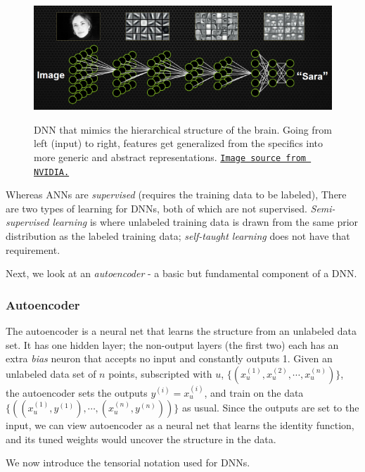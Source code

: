 \documentclass[12pt]{article}  %
\begin{document}
\begin{figure}[h]
\centering
\includegraphics[scale=0.9]{images/DNN.png}\\
\caption{DNN that mimics the hierarchical structure of the brain. Going from left (input) to right, features get generalized from the specifics into more generic and abstract representations. \href{http://devblogs.nvidia.com/parallelforall/accelerate-machine-learning-cudnn-deep-neural-network-library/}{\tt Image source from NVIDIA.}}\label{DNN-fig}
\end{figure}


Whereas ANNs are \emph{supervised} (requires the training data to be labeled), There are two types of learning for DNNs, both of which are not supervised. \emph{Semi-supervised learning} is where unlabeled training data is drawn from the same prior distribution as the labeled training data; \emph{self-taught learning} does not have that requirement.

Next, we look at an \emph{autoencoder} - a basic but fundamental component of a DNN.

\subsubsection{Autoencoder}

The autoencoder is a neural net that learns the structure from an unlabeled data set. It has one hidden layer; the non-output layers (the first two) each has an extra \emph{bias} neuron that accepts no input and constantly outputs 1. Given an unlabeled data set of $n$ points, subscripted with $u$, $\{(x^{(1)}_u, x^{(2)}_u, \cdots, x^{(n)}_u )\}$, the autoencoder sets the outputs $y^{(i)} = x^{(i)}_u$, and train on the data $\{((x^{(1)}_u, y^{(1)}), \cdots, (x^{(n)}_u, y^{(n)}) )\}$ as usual. Since the outputs are set to the input, we can view autoencoder as a neural net that learns the identity function, and its tuned weights would uncover the structure in the data.

We now introduce the tensorial notation used for DNNs.
\end{document}

